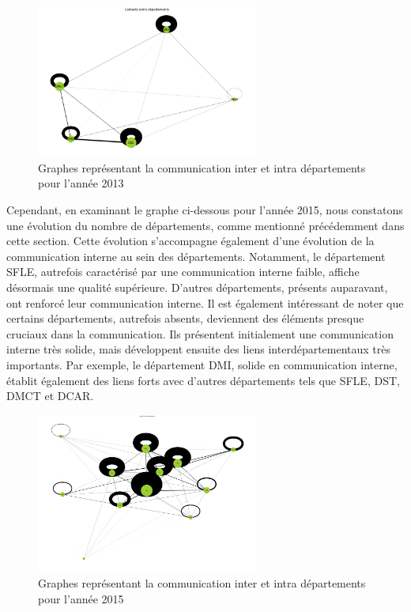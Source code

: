 \documentclass{article}
\begin{document}
\begin{figure}[!h]
    \centering
    \includegraphics[width=0.65\textwidth]{assets/communaute/communaute_communication_2013.png}
    \caption{Graphes représentant la communication inter et intra départements pour l'année 2013}
    \label{fig:communaute_communication_2013}
\end{figure}

Cependant, en examinant le graphe ci-dessous pour l'année 2015, nous constatons une évolution du nombre de départements, comme mentionné précédemment dans cette section. Cette évolution s'accompagne également d'une évolution de la communication interne au sein des départements. Notamment, le département SFLE, autrefois caractérisé par une communication interne faible, affiche désormais une qualité supérieure. D'autres départements, présents auparavant, ont renforcé leur communication interne. Il est également intéressant de noter que certains départements, autrefois absents, deviennent des éléments presque cruciaux dans la communication. Ils présentent initialement une communication interne très solide, mais développent ensuite des liens interdépartementaux très importants. Par exemple, le département DMI, solide en communication interne, établit également des liens forts avec d'autres départements tels que SFLE, DST, DMCT et DCAR.

\begin{figure}[!h]
    \centering
    \includegraphics[width=0.65\textwidth]{assets/communaute/communaute_communication_2015.png}
    \caption{Graphes représentant la communication inter et intra départements pour l'année 2015}
    \label{fig:communaute_communication_2015}
\end{figure}
\end{document}
